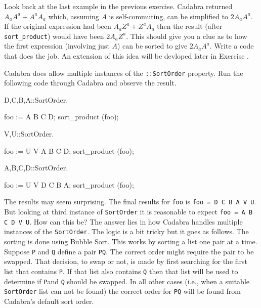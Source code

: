 \documentclass[a4paper,12pt]{article}
\numberwithin{equation}{section}%
\begin{document}
\begin{Exercises}
   \begin{Exercise}
      Look back at the last example in the previous exercise. Cadabra returned $A_{a} A^{a}
      + A^{a} A_{a}$ which, assuming $A$ is self-commuting, can be simplified to $2A_{a}
      A^{a}$. If the original expression had been $A_{a} Z^{a} + Z^{a} A_{a}$ then the
      result (after \verb|sort_product|) would have been $2 A_{a} Z^{a}$. This should give
      you a clue as to how the first expression (involving just $A$) can be sorted to give
      $2A_{a} A^{a}$. Write a code that does the job. An extension of this idea will
      be devloped later in Exercise .
   \end{Exercise}

   \begin{Exercise}
      Cadabra does allow multiple instances of the \verb|::SortOrder| property. Run the
      following code through Cadabra and observe the result.
      \begin{cadabra}
         {D,C,B,A}::SortOrder.

         foo := A B C D;
         sort_product (foo);

         {V,U}::SortOrder.

         foo := U V A B C D;
         sort_product (foo);

         {A,B,C,D}::SortOrder.

         foo := U V D C B A;
         sort_product (foo);
      \end{cadabra}
      The results may seem surprising. The final results for \verb|foo| is
      \verb|foo = D C B A V U|.
      But looking at third instance of \verb|SortOrder| it is reasonable to expect
      \verb|foo = A B C D V U|. How can this be? The answer lies in how Cadabra handles
      multiple instances of the \verb|SortOrder|. The logic is a bit tricky but it goes as
      follows. The sorting is done using Bubble Sort. This works by sorting a list one pair
      at a time. Suppose \verb|P| and \verb|Q| define a pair \verb|PQ|. The correct order
      might require the pair to be swapped. That decision, to swap or not, is made by first
      searching for the first list that contains \verb|P|. If that list also contains
      \verb|Q| then that list will be used to determine if \verb|P|and \verb|Q| should be
      swapped. In all other cases (i.e., when a suitable \verb|SortOrder| list can not be
      found) the correct order for \verb|PQ| will be found from Cadabra's default sort order.


\end{Exercise}
\end{Exercises}
\end{document}
